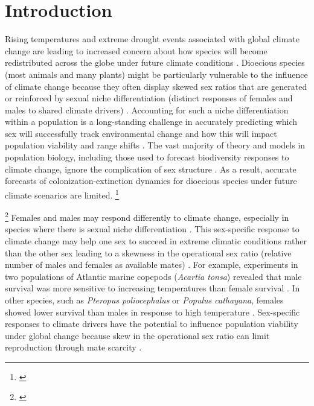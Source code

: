 \documentclass[11pt]{article}\usepackage[]{graphicx}\usepackage[usenames,dvipsnames]{xcolor}
\newcommand{\tom}[2]{{\color{red}{#1}}\footnote{\textit{\color{red}{#2}}}}
\begin{document}
\section*{Introduction}
Rising temperatures and extreme drought events associated with global climate change are leading to increased concern about how species will become redistributed across the globe under future climate conditions \citep{bertrand2011changes,gamelon2017interactions,smith2024extreme}.
Dioecious species (most animals and many plants) might be particularly vulnerable to the influence of climate change because they often display skewed sex ratios that are generated or reinforced by sexual niche differentiation (distinct responses of females and males to shared climate drivers) \citep{Tognetti2012}. 
Accounting for such a niche differentiation within a population is a long-standing challenge in accurately predicting which sex will successfully track environmental change and how this will impact population viability and range shifts \citep{jones1999sex,gissi2023exploring}. 
The vast majority of theory and models in population biology, including those used to forecast biodiversity responses to climate change, ignore the complication of sex structure \citep{pottier2021sexual,ellis2017does}.
As a result, accurate forecasts of colonization-extinction dynamics for dioecious species under future climate scenarios are limited. \tom{}{This is a great opening paragraph!} 

\tom{Climate change can influence dioecious populations via shifts in sex ratio.}{This paragraph is really good but notice that the topic sentence (and much that follows) is largely redundant with the first paragraph. I would suggest creating clearer distinction between paragraphs.} 
Females and males may respond differently to climate change, especially in species where there is sexual niche differentiation \citep{gissi2023exploring,gissi2023sex,hultine2016climate}. 
This sex-specific response to climate change may help one sex to succeed in extreme climatic conditions rather than the other sex \citep{zhao2012sex, burli2022environmental} leading to a skewness in the operational sex ratio (relative number of males and females as available mates) \citep{eberhart2017sex}.
For example, experiments in two populations of Atlantic marine copepods (\textit{Acartia tonsa}) revealed that male survival was more sensitive to increasing temperatures than female survival \citep{sasaki2019complex}.
In other species, such as \textit{Pteropus poliocephalus} or \textit {Populus cathayana}, females showed lower survival than males in response to high temperature \citep{welbergen2008climate,zhao2012sex}. 
Sex-specific responses to climate drivers have the potential to influence population viability under global change because skew in the operational sex ratio can limit reproduction through mate scarcity \citep{petry2016sex}.
\end{document}
